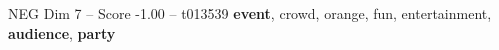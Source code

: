 \begin{textsample}{NEG Dim 7 – Score -1.00 – t013539}  \label{ex:f7_neg_017}
\textbf{event}, crowd, orange, fun, entertainment, \textbf{audience}, \textbf{party}

\end{textsample}
